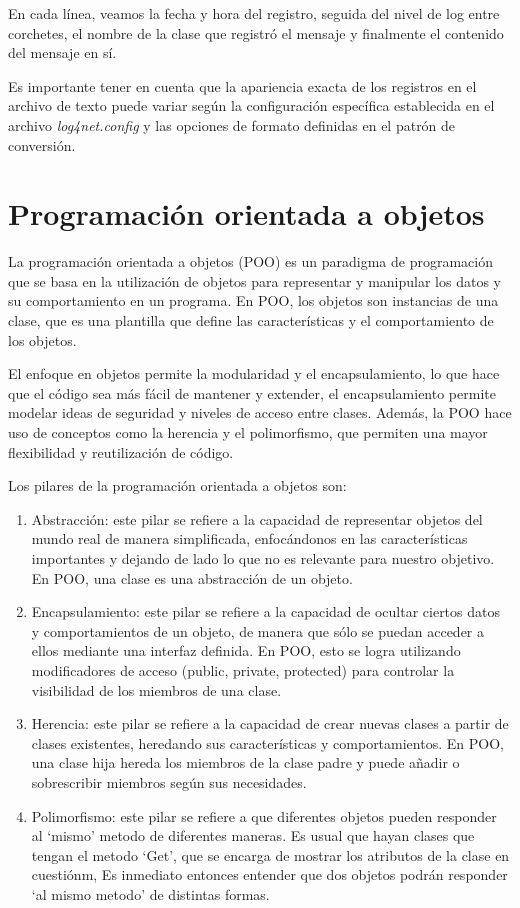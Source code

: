 \documentclass[executivepaper]{article}
\begin{document}
En cada línea, veamos la fecha y hora del registro, seguida del nivel de log entre corchetes, el nombre de la clase que registró el mensaje y finalmente el contenido del mensaje en sí.

Es importante tener en cuenta que la apariencia exacta de los registros en el archivo de texto puede variar según la configuración específica establecida en el archivo \emph{log4net.config} y las opciones de formato definidas en el patrón de conversión.

\section{Programación orientada a objetos}

La programación orientada a objetos (POO) es un paradigma de programación que se basa en la utilización de objetos para representar y manipular los datos y su comportamiento en un programa. En POO, los objetos son instancias de una clase, que es una plantilla que define las características y el comportamiento de los objetos.

El enfoque en objetos permite la modularidad y el encapsulamiento, lo que hace que el código sea más fácil de mantener y extender, el encapsulamiento permite modelar ideas de seguridad y niveles de acceso entre clases. Además, la POO hace uso de conceptos como la herencia y el polimorfismo, que permiten una mayor flexibilidad y reutilización de código.

Los pilares de la programación orientada a objetos son:

\begin{enumerate}
    \item Abstracción: este pilar se refiere a la capacidad de representar objetos del mundo real de manera simplificada, enfocándonos en las características importantes y dejando de lado lo que no es relevante para nuestro objetivo. En POO, una clase es una abstracción de un objeto.
    \item Encapsulamiento: este pilar se refiere a la capacidad de ocultar ciertos datos y comportamientos de un objeto, de manera que sólo se puedan acceder a ellos mediante una interfaz definida. En POO, esto se logra utilizando modificadores de acceso (public, private, protected) para controlar la visibilidad de los miembros de una clase.
    \item Herencia: este pilar se refiere a la capacidad de crear nuevas clases a partir de clases existentes, heredando sus características y comportamientos. En POO, una clase hija hereda los miembros de la clase padre y puede añadir o sobrescribir miembros según sus necesidades.
    \item Polimorfismo: este pilar se refiere a que diferentes objetos pueden responder al \enquote*{mismo} metodo de diferentes maneras. Es usual que hayan clases que tengan el metodo \enquote*{Get}, que se encarga de mostrar los atributos de la clase en cuestiónm, Es inmediato entonces entender que dos objetos podrán responder \enquote*{al mismo metodo} de distintas formas. 
\end{enumerate}
\end{document}
